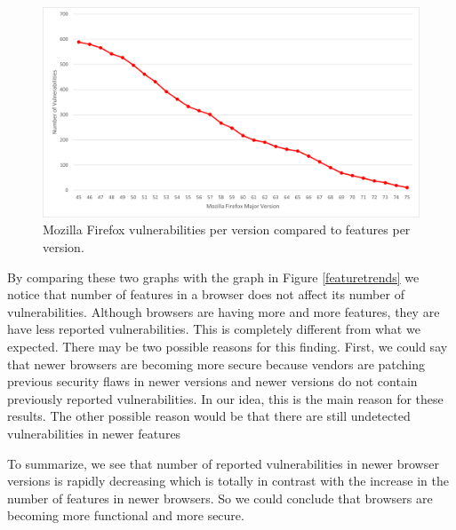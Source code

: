 \begin{figure}[ht]
    \centering
    \includegraphics[width=\columnwidth]{figures/Firefox-Vulnerabilities.png}
    \caption{Mozilla Firefox vulnerabilities per version compared to features per version.}
    \label{fig:firefox-vuln}
\end{figure}

By comparing these two graphs with the graph in Figure \ref{featuretrends} we notice that number of features in a browser does not affect its number of vulnerabilities. Although browsers are having more and more features, they are have less reported vulnerabilities. This is completely different from what we expected. There may be two possible reasons for this finding. First, we could say that newer browsers are becoming more secure because vendors are patching previous security flaws in newer versions and newer versions do not contain previously reported vulnerabilities. In our idea, this is the main reason for these results. The other possible reason would be that there are still undetected vulnerabilities in newer features 

To summarize, we see that number of reported vulnerabilities in newer browser versions is rapidly decreasing which is totally in contrast with the increase in the number of features in newer browsers. So we could conclude that browsers are becoming more functional and more secure.